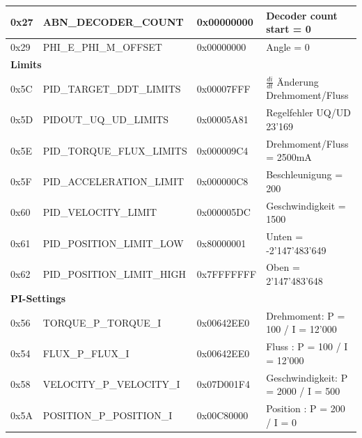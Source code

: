 \begin{table}[H]
\begin{tabularx}{\linewidth}{|l|l|l|X|}
0x27         & ABN\_DECODER\_COUNT           & 0x00000000 & Decoder count start = 0 \\ \hline
0x29         & PHI\_E\_PHI\_M\_OFFSET  & 0x00000000 & Angle = 0    \\ \hline
\multicolumn{4}{|l|}{\textbf{Limits}}                         \\ \hline
0x5C         & PID\_TARGET\_DDT\_LIMITS & 0x00007FFF & $\frac{di}{dt}$ Änderung Drehmoment/Fluss   \\ \hline
0x5D         & PIDOUT\_UQ\_UD\_LIMITS         & 0x00005A81 &    Regelfehler UQ/UD 23'169\\ \hline
0x5E         & PID\_TORQUE\_FLUX\_LIMITS      & 0x000009C4 &    Drehmoment/Fluss = 2500mA\\ \hline
0x5F         & PID\_ACCELERATION\_LIMIT      & 0x000000C8 & Beschleunigung = 200     \\ \hline
0x60         & PID\_VELOCITY\_LIMIT          & 0x000005DC & Geschwindigkeit = 1500    \\ \hline
0x61         & PID\_POSITION\_LIMIT\_LOW & 0x80000001 &    Unten = -2'147'483'649 \\ \hline
0x62         & PID\_POSITION\_LIMIT\_HIGH     & 0x7FFFFFFF & Oben  = 2'147'483'648  \\ \hline
\multicolumn{4}{|l|}{\textbf{PI-Settings}}       \\ \hline
0x56         & TORQUE\_P\_TORQUE\_I    & 0x00642EE0 &  Drehmoment: P = 100 / I = 12'000   \\ \hline
0x54         & FLUX\_P\_FLUX\_I  & 0x00642EE0 &  Fluss : P = 100 / I = 12'000   \\ \hline
0x58         & VELOCITY\_P\_VELOCITY\_I  & 0x07D001F4 & Geschwindigkeit: P = 2000 / I = 500    \\ \hline
0x5A         & POSITION\_P\_POSITION\_I  & 0x00C80000 & Position : P = 200 / I = 0    \\ \hline
\end{tabularx}
\end{table}